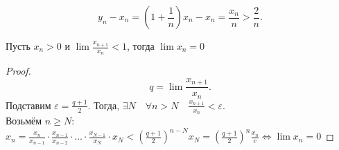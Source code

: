 \documentclass[11pt, oneside]{article}   	%
\begin{document}
\begin{dlemma}
    \[ y_n - x_n = \left(1+\frac{1}{n}\right)x_n - x_n = \frac{x_n}{n} > \frac{2}{n} .\] 
\end{dlemma}
\begin{theorem}
    Пусть $x_n>0$ и  $\lim \frac{x_{n+1}}{x_n} < 1$, тогда $\lim x_n = 0$
     \begin{proof}
         \[ q = \lim \frac{x_{n+1}}{x_n} .\] 
         Подставим $\varepsilon = \frac{q+1}{2}$. Тогда,  $\exists{N}\quad \forall{n>N}\quad \frac{x_{n+1}}{x_n} < \varepsilon$.\\
         Возьмём $n\ge N$: $x_n = \frac{x_n}{x_{n-1}}\cdot \frac{x_{n-1}}{x_{n-2}} \cdot \ldots \cdot \frac{x_{N-1}}{x_N} \cdot  x_N < \left( \frac{q+1}{2} \right)^{n-N}x_N = \left(\frac{q+1}{2}\right)^{n}\frac{x_n}{c} \iff \lim x_n = 0 $
    \end{proof}
\end{theorem}
\end{document}
